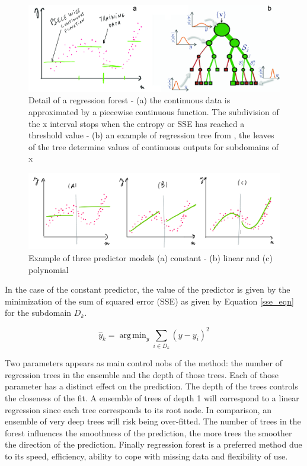 \documentclass{article} %
\DeclareMathOperator*{\argmin}{arg\,min}
\begin{document}
\begin{figure}[h]
	\centering
	\includegraphics[width=1\textwidth]{rf}
	\caption{Detail of a regression forest - (a) the continuous data is approximated by a piecewise continuous function. The subdivision of the x interval stops when the entropy or SSE has reached a threshold value - (b) an example of regression tree from 	\cite{criminisi2011decision}, the leaves of the tree determine values of continuous outputs for subdomains of x}
	\label{fig:rf}
\end{figure}

\begin{figure}[h]
	\centering
	\includegraphics[width=1\textwidth]{rfpredictors}
	\caption{Example of three predictor models (a) constant - (b) linear and (c) polynomial}
	\label{fig:RFpredictors}
\end{figure}

In the case of the constant predictor, the value of the predictor is given by the minimization of the sum of squared error (SSE) as given by Equation \ref{sse_eqn} for the subdomain $D_k$. 

\begin{equation} \label{sse_eqn}
\hat{y}_k = \argmin_y \sum_{i \in D_k} (y-y_i)^2
\end{equation}

Two parameters appears as main control nobs of the method: the number of regression trees in the ensemble and the depth of those trees. Each of those parameter has a distinct effect on the prediction. The depth of the trees controls the closeness of the fit. A ensemble of trees of depth 1 will correspond to a linear regression since each tree corresponds to its root node. In comparison, an ensemble of very deep trees will risk being over-fitted. The number of trees in the forest influences the smoothness of the prediction, the more trees the smoother the direction of the prediction. 
Finally regression forest is a preferred method due to its speed, efficiency, ability to cope with missing data and flexibility of use. 
\end{document}
